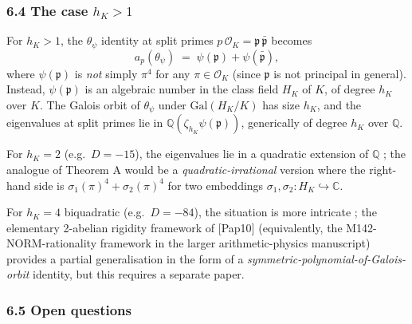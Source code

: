 \documentclass[
  11pt,
  a4paper,
]{amsart}
\begin{document}
\hypertarget{the-case-h_k-1}{%
\subsubsection{\texorpdfstring{6.4 The case \(h_K > 1\)}{6.4 The case h\_K \textgreater{} 1}}\label{the-case-h_k-1}}

For \(h_K > 1\), the \(\theta_\psi\) identity at split primes \(p\,\mathcal{O}_K = \mathfrak{p}\,\bar{\mathfrak{p}}\) becomes
\[
a_p(\theta_\psi) \;=\; \psi(\mathfrak{p}) + \psi(\bar{\mathfrak{p}}),
\]
where \(\psi(\mathfrak{p})\) is \emph{not} simply \(\pi^4\) for any \(\pi \in \mathcal{O}_K\) (since \(\mathfrak{p}\) is not principal in general). Instead, \(\psi(\mathfrak{p})\) is an algebraic number in the class field \(H_K\) of \(K\), of degree \(h_K\) over \(K\). The Galois orbit of \(\theta_\psi\) under \(\mathrm{Gal}(H_K / K)\) has size \(h_K\), and the eigenvalues at split primes lie in \(\mathbb{Q}(\zeta_{h_K} \psi(\mathfrak{p}))\), generically of degree \(h_K\) over \(\mathbb{Q}\).

For \(h_K = 2\) (e.g.~\(D = -15\)), the eigenvalues lie in a quadratic extension of \(\mathbb{Q}\) ; the analogue of Theorem A would be a \emph{quadratic-irrational} version where the right-hand side is \(\sigma_1(\pi)^4 + \sigma_2(\pi)^4\) for two embeddings \(\sigma_1, \sigma_2 : H_K \hookrightarrow \mathbb{C}\).

For \(h_K = 4\) biquadratic (e.g.~\(D = -84\)), the situation is more intricate ; the elementary 2-abelian rigidity framework of {[}Pap10{]} (equivalently, the M142-NORM-rationality framework in the larger arithmetic-physics manuscript) provides a partial generalisation in the form of a \emph{symmetric-polynomial-of-Galois-orbit} identity, but this requires a separate paper.

\hypertarget{open-questions}{%
\subsubsection{6.5 Open questions}\label{open-questions}}
\end{document}
